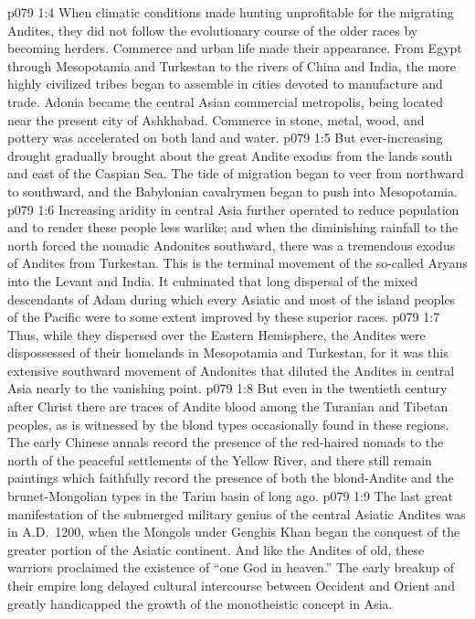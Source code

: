 \vs p079 1:4 When climatic conditions made hunting unprofitable for the migrating Andites, they did not follow the evolutionary course of the older races by becoming herders. Commerce and urban life made their appearance. From Egypt through Mesopotamia and Turkestan to the rivers of China and India, the more highly civilized tribes began to assemble in cities devoted to manufacture and trade. Adonia became the central Asian commercial metropolis, being located near the present city of Ashkhabad. Commerce in stone, metal, wood, and pottery was accelerated on both land and water.
\vs p079 1:5 But ever\hyp{}increasing drought gradually brought about the great Andite exodus from the lands south and east of the Caspian Sea. The tide of migration began to veer from northward to southward, and the Babylonian cavalrymen began to push into Mesopotamia.
\vs p079 1:6 Increasing aridity in central Asia further operated to reduce population and to render these people less warlike; and when the diminishing rainfall to the north forced the nomadic Andonites southward, there was a tremendous exodus of Andites from Turkestan. This is the terminal movement of the so\hyp{}called Aryans into the Levant and India. It culminated that long dispersal of the mixed descendants of Adam during which every Asiatic and most of the island peoples of the Pacific were to some extent improved by these superior races.
\vs p079 1:7 Thus, while they dispersed over the Eastern Hemisphere, the Andites were dispossessed of their homelands in Mesopotamia and Turkestan, for it was this extensive southward movement of Andonites that diluted the Andites in central Asia nearly to the vanishing point.
\vs p079 1:8 But even in the twentieth century after Christ there are traces of Andite blood among the Turanian and Tibetan peoples, as is witnessed by the blond types occasionally found in these regions. The early Chinese annals record the presence of the red\hyp{}haired nomads to the north of the peaceful settlements of the Yellow River, and there still remain paintings which faithfully record the presence of both the blond\hyp{}Andite and the brunet\hyp{}Mongolian types in the Tarim basin of long ago.
\vs p079 1:9 The last great manifestation of the submerged military genius of the central Asiatic Andites was in A.D.~1200, when the Mongols under Genghis Khan began the conquest of the greater portion of the Asiatic continent. And like the Andites of old, these warriors proclaimed the existence of “one God in heaven.” The early breakup of their empire long delayed cultural intercourse between Occident and Orient and greatly handicapped the growth of the monotheistic concept in Asia.
